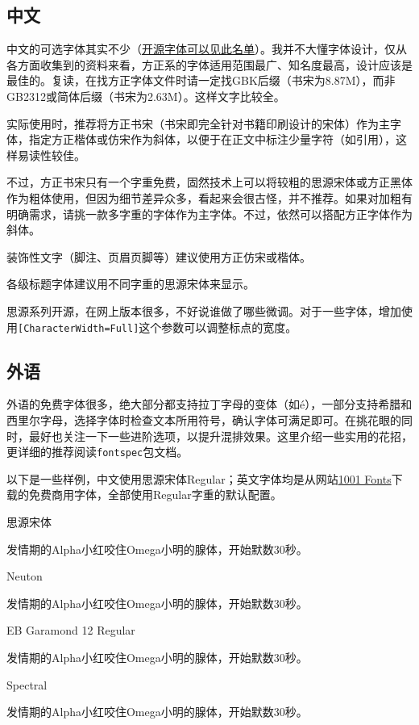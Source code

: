 \documentclass[10pt,openany]{book}
\newcommand{\testtext}{

发情期的Alpha小红咬住Omega小明的腺体，开始默数30秒。}
\begin{document}
\subsection{中文}

中文的可选字体其实不少（\href{https://drxie.github.io/OSFCC/}{开源字体可以见此名单}）。我并不大懂字体设计，仅从各方面收集到的资料来看，方正系的字体适用范围最广、知名度最高，设计应该是最佳的。复读，在找方正字体文件时请一定找GBK后缀（书宋为8.87M），而非GB2312或简体后缀（书宋为2.63M）。这样文字比较全。

实际使用时，推荐将方正书宋（书宋即完全针对书籍印刷设计的宋体）作为主字体，指定方正楷体或仿宋作为斜体，以便于在正文中标注少量字符（如引用），这样易读性较佳。

不过，方正书宋只有一个字重免费，固然技术上可以将较粗的思源宋体或方正黑体作为粗体使用，但因为细节差异众多，看起来会很古怪，并不推荐。如果对加粗有明确需求，请挑一款多字重的字体作为主字体。不过，依然可以搭配方正字体作为斜体。

装饰性文字（脚注、页眉页脚等）建议使用方正仿宋或楷体。

各级标题字体建议用不同字重的思源宋体来显示。

思源系列开源，在网上版本很多，不好说谁做了哪些微调。对于一些字体，增加使用\texttt{[CharacterWidth=Full]}这个参数可以调整标点的宽度。

\subsection{外语}

外语的免费字体很多，绝大部分都支持拉丁字母的变体（如é），一部分支持希腊和西里尔字母，选择字体时检查文本所用符号，确认字体可满足即可。在挑花眼的同时，最好也关注一下一些进阶选项，以提升混排效果。这里介绍一些实用的花招，更详细的推荐阅读\texttt{fontspec}包文档。

以下是一些样例，中文使用思源宋体Regular；英文字体均是从网站\href{https://www.1001fonts.com}{1001 Fonts}下载的免费商用字体，全部使用Regular字重的默认配置。

\begin{adjustwidth}{2em}{2em}
    \blankpar

    \songtien 思源宋体\testtext

    Neuton\testtext

    EB Garamond 12 Regular\testtext

    Spectral\testtext

    \blankpar
\end{adjustwidth}
\end{document}
